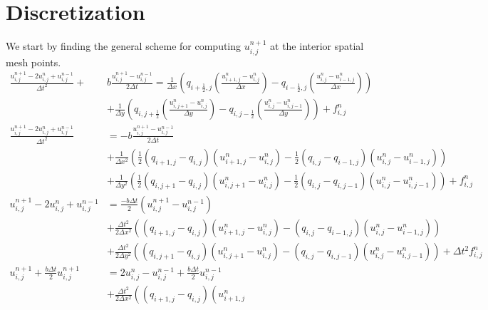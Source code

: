 \documentclass[12pt, norsk, a4paper]{article}
\begin{document}
\section*{Discretization}
We start by finding the general scheme for computing $u_{i,j}^{n+1}$ at the
interior spatial mesh points.
\begin{align*}
\frac{u_{i,j}^{n+1}-2u_{i,j}^n+u_{i,j}^{n-1}}{\Delta t^2} + & b
\frac{u_{i,j}^{n+1}-u_{i,j}^{n-1}}{2\Delta t} = \frac{1}{\Delta x}
\left(q_{i+\frac{1}{2},j} \left( \frac{u_{i+1,j}^n - u_{i,j}^n}{\Delta x}\right)
    - q_{i-\frac{1}{2},j} \left( \frac{u_{i,j}^n - u_{i-1,j}^n}{\Delta x}\right)\right) \\
    & + \frac{1}{\Delta y} \left( q_{i,j+\frac{1}{2}} \left( \frac{u_{i,j+1}^n 
    - u_{i,j}^n}{\Delta y} \right) - q_{i,j-\frac{1}{2}} \left( \frac{u_{i,j}^n
    - u_{i,j-1}^n}{\Delta y}\right)\right) + f_{i,j}^n \\
\frac{u_{i,j}^{n+1}-2u_{i,j}^n+u_{i,j}^{n-1}}{\Delta t^2} &= - b
\frac{u_{i,j}^{n+1}-u_{i,j}^{n-1}}{2\Delta t} \\ & + \frac{1}{\Delta x^2} \left(
        \frac{1}{2}\left( q_{i+1,j} - q_{i,j} \right) \left(u_{i+1,j}^n 
        - u_{i,j}^n \right) - \frac{1}{2}  \left(q_{i,j}-q_{i-1,j} \right)
        \left( u_{i,j}^n - u_{i-1,j}^n \right)\right) \\
        &+ \frac{1}{\Delta y^2} \left(
        \frac{1}{2}\left( q_{i,j+1} - q_{i,j} \right) \left(u_{i,j+1}^n 
        - u_{i,j}^n \right) - \frac{1}{2} \left(q_{i,j}-q_{i,j-1} \right)
        \left( u_{i,j}^n - u_{i,j-1}^n \right)\right) + f_{i,j}^n \\
u_{i,j}^{n+1}-2u_{i,j}^n+u_{i,j}^{n-1} &=  \frac{-b \Delta t}{2} (u_{i,j}^{n+1}-u_{i,j}^{n-1}) \\
        &+\frac{\Delta t^2}{2 \Delta x^2} \left(
        \left( q_{i+1,j} - q_{i,j} \right) \left(u_{i+1,j}^n 
        - u_{i,j}^n \right) - \left(q_{i,j}-q_{i-1,j} \right)
        \left( u_{i,j}^n - u_{i-1,j}^n \right)\right) \\
        &+ \frac{\Delta t^2}{2 \Delta y^2} \left(
        \left( q_{i,j+1} - q_{i,j} \right) \left(u_{i,j+1}^n 
        - u_{i,j}^n \right) - \left(q_{i,j}-q_{i,j-1} \right)
        \left( u_{i,j}^n - u_{i,j-1}^n \right)\right) + \Delta t^2f_{i,j}^n \\
u_{i,j}^{n+1} + \frac{b \Delta t}{2}u_{i,j}^{n+1} &= 2u_{i,j}^n-u_{i,j}^{n-1}
+ \frac{b \Delta t}{2}u_{i,j}^{n-1} \\
 &+\frac{\Delta t^2}{2 \Delta x^2} \left(
        \left( q_{i+1,j} - q_{i,j} \right) \left(u_{i+1,j}^n 

\end{align*}
\end{document}

